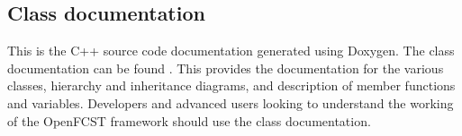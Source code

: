 \subsection{Class documentation}

This is the C++ source code documentation generated using Doxygen. The class documentation can be found . This provides the documentation for the various classes, hierarchy and inheritance diagrams, and description of member functions and variables. Developers and advanced users looking to understand the working of the OpenFCST framework should use the class documentation.

